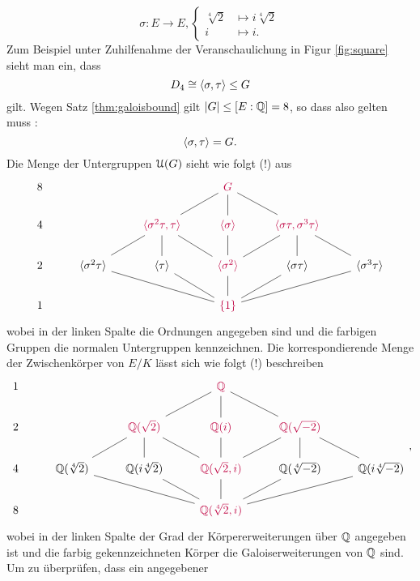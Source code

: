 \documentclass{book}
\begin{document}
\begin{exa}
    \[
        \sigma: E \to E, \begin{cases} \sqrt[4]{2} & \mapsto i\sqrt[4]{2}\\ i & \mapsto i. \end{cases}
    \]
    Zum Beispiel unter Zuhilfenahme der Veranschaulichung in Figur \ref{fig:square} sieht man ein, dass
    \[
        D_4 \cong \langle \sigma,\tau \rangle \le G
    \]
    gilt. Wegen Satz \ref{thm:galoisbound} gilt $|G| \le [E:\mathbb{Q}] = 8$, so dass also gelten muss :
    \[
            \langle \sigma,\tau \rangle = G.
    \]
    Die Menge der Untergruppen $\EuScript{U}(G)$ sieht wie folgt (!) aus
    \[
    \begin{tikzcd}
        8  &  & & \color{purple}G \ar[dl,dash]\ar[d,dash]\ar[dr,dash]& &\\
        4  &   & \color{purple} \sk{\sigma^2\tau,  \tau} \ar[dl,dash]\ar[d,dash]\ar[dr,dash] &\color{purple} \sk{\sigma}\ar[d,dash] & \ar[dl,dash]\ar[d,dash]\ar[dr,dash]\color{purple}\sk{\sigma\tau,  \sigma^3\tau} & \\
        2  & \sk{\sigma^2\tau} & \sk{\tau}  &\color{purple} \sk{\sigma^2} & \sk{\sigma\tau} & \sk{\sigma^3\tau}  \\
        1  &                & &\color{purple} \{1 \}\ar[ull,dash] \ar[ul,dash]\ar[u,dash]\ar[ur,dash] \ar[urr,dash]& & 
    \end{tikzcd}
    \]
    wobei in der linken Spalte die Ordnungen angegeben sind und die farbigen
    Gruppen die normalen Untergruppen kennzeichnen. Die korrespondierende Menge
    der Zwischenkörper von $E/K$ lässt sich wie folgt (!) beschreiben
    \[
    \begin{tikzcd}
        1  &  & & \color{purple}\QQ \ar[dl,dash]\ar[d,dash]\ar[dr,dash]& &\\
        2  &   &\color{purple} \QQ(\sqrt{2}) \ar[dl,dash]\ar[d,dash]\ar[dr,dash] &\color{purple} \QQ(i) \ar[d,dash] & \ar[dl,dash]\ar[d,dash]\ar[dr,dash]\color{purple}\QQ(\sqrt{-2}) & \\
        4  & \QQ(\sqrt[4]{2}) & \QQ(i\sqrt[4]{2})  &\color{purple} \QQ(\sqrt{2},i)  & \QQ(\sqrt[4]{-2}) & \QQ(i\sqrt[4]{-2})  \\
        8  &                & &\color{purple} \QQ(\sqrt[4]{2},i) \ar[ull,dash] \ar[ul,dash]\ar[u,dash]\ar[ur,dash] \ar[urr,dash]& & 
    \end{tikzcd},
    \]
    wobei in der linken Spalte der Grad der Körpererweiterungen über $\mathbb{Q}$
    angegeben ist und die farbig gekennzeichneten Körper die
    Galoiserweiterungen von $\mathbb{Q}$ sind. Um zu überprüfen, dass ein angegebener

\end{exa}
\end{document}
